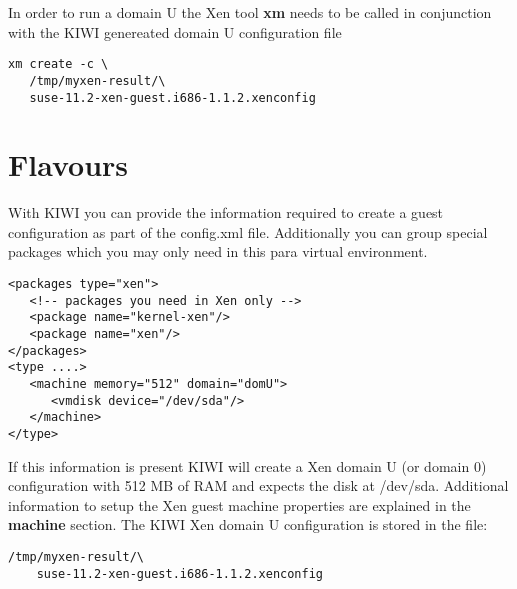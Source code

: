 In order to run a domain U the Xen tool \textbf{xm} needs to be called
in conjunction with the KIWI genereated domain U configuration file

\begin{Command}{13cm}
\begin{verbatim}
xm create -c \
   /tmp/myxen-result/\
   suse-11.2-xen-guest.i686-1.1.2.xenconfig
\end{verbatim}
\end{Command}

\section{Flavours}

With KIWI you can provide the information
required to create a guest configuration as part of the config.xml
file. Additionally you can group special packages which you may only
need in this para virtual environment.

\begin{Command}{13cm}
\begin{verbatim}
<packages type="xen">
   <!-- packages you need in Xen only -->
   <package name="kernel-xen"/>
   <package name="xen"/>
</packages>
<type ....>
   <machine memory="512" domain="domU">
      <vmdisk device="/dev/sda"/>
   </machine>
</type>
\end{verbatim}
\end{Command}

If this information is present KIWI will create a Xen domain U
(or domain 0)
configuration with 512 MB of RAM and expects the disk at /dev/sda.
Additional information to setup the Xen guest machine properties are
explained in the \textbf{machine} section. The KIWI Xen domain U
configuration is stored in the file:

\begin{Command}{13cm}
\begin{verbatim}
/tmp/myxen-result/\
    suse-11.2-xen-guest.i686-1.1.2.xenconfig
\end{verbatim}
\end{Command}
